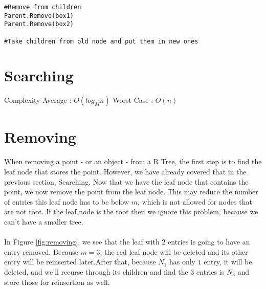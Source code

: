\documentclass{article}
\begin{document}
\begin{multicols}{2}[]
\begin{lstlisting}
#Remove from children
Parent.Remove(box1)
Parent.Remove(box2)

#Take children from old node and put them in new ones
\end{lstlisting}

\section{Searching}
Complexity
Average : $O(log_Mn)$
Worst Case : $O(n)$

\section{Removing}

\paragraph{}
When removing a point - or an object - from a R Tree, the first step is to find the leaf node that stores the point.
However, we have already covered that in the previous section, Searching. Now that we have the leaf node that contains
the point, we now remove the point from the leaf node. This may reduce the number of entries this leaf node has to be below
$m$, which is not allowed for nodes that are not root. If the leaf node is the root then we ignore this problem, because
we can't have a smaller tree.\\

\begin{minipage}{\linewidth}
\centering
{}
\label{fig:removing}
\end{minipage}

\paragraph{}
In Figure \ref{fig:removing}, we see that the leaf with $2$ entries is going to have an entry removed. Because $m=3$, the red leaf node will be deleted and its other entry will be reinserted later.After that, because $N_1$ has only $1$ entry, it will be deleted, and we'll recurse through its children and find the $3$ entries is $N_3$ and store those for reinsertion as well.

\end{multicols}
\end{document}
